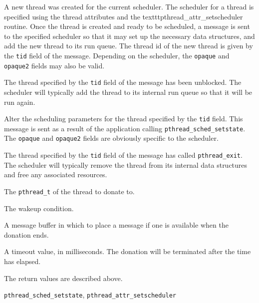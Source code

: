 \begin{apidesc}
	\begin{icsymlist}
	\item[MSG_SCHED_NEWTHREAD] A new thread was created for the current
	scheduler. The scheduler for a thread is specified using the thread
	attributes and the texttt{pthread_attr_setscheduler} routine. Once
	the thread is created and ready to be scheduled, a message is sent
	to the specified scheduler so that it may set up the necessary data
	structures, and add the new thread to its run queue. The thread id
	of the new thread is given by the \texttt{tid} field of the
	message. Depending on the scheduler, the \texttt{opaque} and
	\texttt{opaque2} fields may also be valid. 

	\item[MSG_SCHED_UNBLOCK] The thread specified by the \texttt{tid}
	field of the message has been unblocked. The scheduler will
	typically add the thread to its internal run queue so that it will
	be run again. 

	\item[MSG_SCHED_SETSTATE] Alter the scheduling parameters for the
	thread specified by the \texttt{tid} field. This message is sent as
	a result of the application calling \texttt{pthread_sched_setstate}. 
        The \texttt{opaque} and	\texttt{opaque2} fields are obviously
        specific to the scheduler.

	\item[MSG_SCHED_EXITED] The thread specified by the \texttt{tid}
	field of the message has called \texttt{pthread_exit}. The scheduler
	will typically remove the thread from its internal data structures
	and free any associated resources. 
	\end{icsymlist}
\end{apidesc}
\begin{apiparm}
	\item[tid]
		The {\tt pthread_t} of the thread to donate to.
	\item[wakecond]
		The wakeup condition.
	\item[msg]
		A message buffer in which to place a message if one is
		available when the donation ends.
	\item[timeout]
		A timeout value, in milliseconds. The donation will be
		terminated after the time has elapsed.
\end{apiparm}
\begin{apiret}
	The return values are described above.
\end{apiret}
\begin{apirel}
	{\tt pthread_sched_setstate}, {\tt pthread_attr_setscheduler}
\end{apirel}



